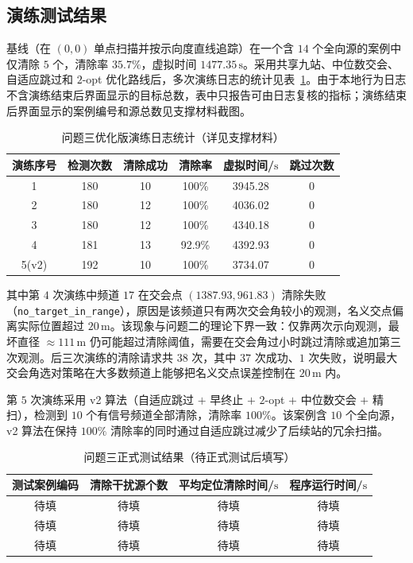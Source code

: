 \documentclass[12pt,a4paper]{ctexart}
\begin{document}
\subsection{演练测试结果}
\label{sec:q3-rehearsal}
基线（在 $(0,0)$ 单点扫描并按示向度直线追踪）在一个含 $14$ 个全向源的案例中仅清除 $5$ 个，清除率 $35.7\%$，虚拟时间 $1477.35\,\mathrm{s}$。采用共享九站、中位数交会、自适应跳过和 $2$-opt 优化路线后，多次演练日志的统计见表~\ref{tab:practice}。由于本地行为日志不含演练结束后界面显示的目标总数，表中只报告可由日志复核的指标；演练结束后界面显示的案例编号和源总数见支撑材料截图。

\begin{table}[H]
\centering
\caption{问题三优化版演练日志统计（详见支撑材料）}
\begin{tabular}{cccccc}
\toprule
演练序号 & 检测次数 & 清除成功 & 清除率 & 虚拟时间/$\mathrm{s}$ & 跳过次数 \\
\midrule
1 & 180 & 10 & 100\% & 3945.28 & 0 \\
2 & 180 & 12 & 100\% & 4036.02 & 0 \\
3 & 180 & 12 & 100\% & 4340.18 & 0 \\
4 & 181 & 13 & 92.9\% & 4392.93 & 0 \\
5(v2) & 192 & 10 & 100\% & 3734.07 & 0 \\
\bottomrule
\end{tabular}
\label{tab:practice}
\end{table}

\noindent 其中第 $4$ 次演练中频道 $17$ 在交会点 $(1387.93,961.83)$ 清除失败（\texttt{no\_target\_in\_range}），原因是该频道只有两次交会角较小的观测，名义交点偏离实际位置超过 $20\,\mathrm{m}$。该现象与问题二的理论下界一致：仅靠两次示向观测，最坏直径 $\approx 111\,\mathrm{m}$ 仍可能超过清除阈值，需要在交会角过小时跳过清除或追加第三次观测。后三次演练的清除请求共 $38$ 次，其中 $37$ 次成功、$1$ 次失败，说明最大交会角选对策略在大多数频道上能够把名义交点误差控制在 $20\,\mathrm{m}$ 内。

第 $5$ 次演练采用 v2 算法（自适应跳过 $+$ 早终止 $+$ $2$-opt $+$ 中位数交会 $+$ 精扫），检测到 $10$ 个有信号频道全部清除，清除率 $100\%$。该案例含 $10$ 个全向源，v2 算法在保持 $100\%$ 清除率的同时通过自适应跳过减少了后续站的冗余扫描。

\begin{table}[H]
\centering
\caption{问题三正式测试结果（待正式测试后填写）}
\begin{tabular}{cccc}
\toprule
测试案例编码 & 清除干扰源个数 & 平均定位清除时间/$\mathrm{s}$ & 程序运行时间/$\mathrm{s}$ \\
\midrule
待填 & 待填 & 待填 & 待填 \\
待填 & 待填 & 待填 & 待填 \\
待填 & 待填 & 待填 & 待填 \\
\bottomrule
\end{tabular}
\label{tab:formal-p3}
\end{table}
\end{document}
